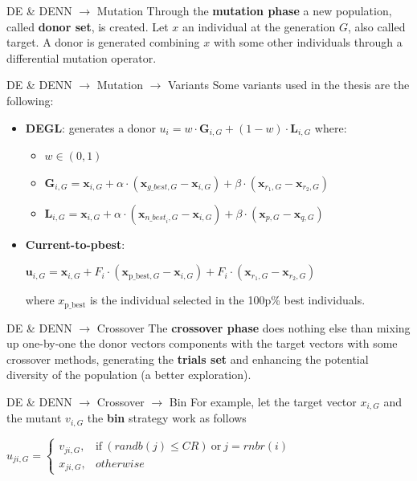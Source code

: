 \documentclass[xcolor={usenames}]{beamer}
\begin{document}
  \iffalse
  \begin{frame}{DE \& DENN \(\rightarrow\) Mutation}
  	Through the \textbf{mutation phase} a new population, called \textbf{donor set}, is created. Let $x$ an individual at the generation $G$, also called target. A donor is generated combining $x$ with some other individuals through a differential mutation operator. 
  \end{frame}
  \begin{frame}{DE \& DENN \(\rightarrow\) Mutation \(\rightarrow\) Variants}
  	Some variants used in the thesis are the following:
  	\begin{itemize}
  		\item{\textbf{DEGL}: generates a donor $u_i = w \cdot \textbf{G}_{i, G} + (1 - w) \cdot \textbf{L}_{i, G}$ where:
  			\begin{itemize}
  				\item{$w \in (0, 1)$}
  				\item{$\textbf{G}_{i, G} = \textbf{x}_{i, G} + \alpha \cdot (\textbf{x}_{\textit{g\_best}, G} - \textbf{x}_{i, G}) + \beta \cdot (\textbf{x}_{r_1, G} - \textbf{x}_{r_2, G})$}
  				\item{$\textbf{L}_{i, G} = \textbf{x}_{i, G} + \alpha \cdot (\textbf{x}_{\textit{n\_best}_i, G} - \textbf{x}_{i, G}) + \beta \cdot (\textbf{x}_{p, G} - \textbf{x}_{q, G})$}
			\end{itemize}}
  		\item{\textbf{Current-to-pbest}: \begin{center}$\textbf{u}_{i, G} = \textbf{x}_{i, G} + F_i \cdot (\textbf{x}_{\textrm{p\_best}, G} - \textbf{x}_{i, G}) + F_i \cdot (\textbf{x}_{r_1, G} - \textbf{x}_{r_2, G})$\end{center}where $x_{\textrm{p\_best}}$ is the individual selected in the 100p\% best individuals.}
	\end{itemize}
  \end{frame}
  \begin{frame}{DE \& DENN \(\rightarrow\) Crossover}
  	The \textbf{crossover phase} does nothing else than mixing up one-by-one the donor vectors components with the target vectors with some crossover methods, generating the \textbf{trials set} and enhancing the potential diversity of the population (a better exploration). 
  \end{frame}
  \begin{frame}{DE \& DENN \(\rightarrow\) Crossover \(\rightarrow\) Bin}
  	For example, let the target vector $x_{i,G}$ and the mutant $v_{i,G}$ the \textbf{bin} strategy work as follows
	\begin{center}
		$u_{ji, G} = \begin{cases}
			v_{ji,G}, & \textrm{if}\ (\textit{randb}(j) \leq \textit{CR})\ \textrm{or}\ j=\textit{rnbr}(i)\\
			x_{ji,G}, & otherwise
		\end{cases}$
	\end{center}
  \end{frame}
\end{document}
